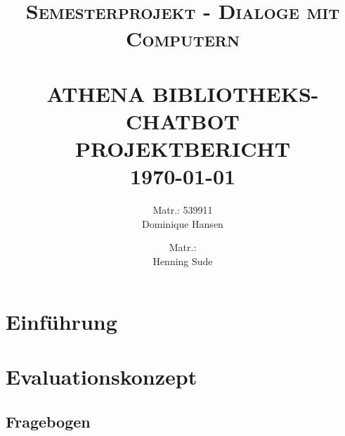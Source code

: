\documentclass[12pt,a4paper]{article}
\title{ \normalsize \textsc{Semesterprojekt - Dialoge mit Computern}
		\\ [2.0cm]
		\HRule{0.5pt} \\ [0.2cm]
		{\Large \textbf{\uppercase{Athena Bibliotheks-chatbot}}} \\
	    {\large \textbf{\uppercase{Projektbericht}}}
		\HRule{2pt} \\ [0.5cm]
		\normalsize \today \vspace*{5\baselineskip}}
\date{}
\author{
		Matr.: 539911 \\ 
		Dominique Hansen \\
		\and
		Matr.: \\
		Henning Sude \\}
\begin{document}
\maketitle

\clearpage

\tableofcontents
\clearpage

\section{Einführung}

\section{Evaluationskonzept}

\subsection{Fragebogen}
\end{document}
